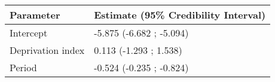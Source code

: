 \begin{table}[ht]
\centering
\begin{tabular}{ll}
  \hline
Parameter & Estimate (95\% Credibility Interval) \\ 
  \hline
Intercept & -5.875 (-6.682 ; -5.094) \\ 
  Deprivation index & 0.113 (-1.293 ; 1.538) \\ 
  Period & -0.524 (-0.235 ; -0.824) \\ 
   \hline
\end{tabular}
\end{table}
